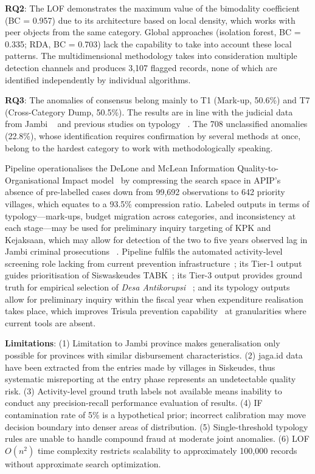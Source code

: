 \documentclass[3p,times,procedia]{elsarticle}
\begin{document}
\textbf{RQ2}: The LOF demonstrates the maximum value of the bimodality coefficient (BC = 0.957) due to its architecture based on local density, which works with peer objects from the same category. Global approaches (isolation forest, BC = 0.335; RDA, BC = 0.703) lack the capability to take into account these local patterns. The multidimensional methodology takes into consideration multiple detection channels and produces 3,107 flagged records, none of which are identified independently by individual algorithms.

\textbf{RQ3}: The anomalies of consensus belong mainly to T1 (Mark-up, 50.6\%) and T7 (Cross-Category Dump, 50.5\%). The results are in line with the judicial data from Jambi ~\cite{ref15,ref16,ref17,ref18} and previous studies on typology ~\cite{ref13,ref14}. The 708 unclassified anomalies (22.8\%), whose identification requires confirmation by several methods at once, belong to the hardest category to work with methodologically speaking.

Pipeline operationalises the DeLone and McLean Information Quality-to-Organisational Impact model~\cite{ref31} by compressing the search space in APIP’s absence of pre-labelled cases down from 99,692 observations to 642 priority villages, which equates to a 93.5\% compression ratio. Labeled outputs in terms of typology—mark-ups, budget migration across categories, and inconsistency at each stage—may be used for preliminary inquiry targeting of KPK and Kejaksaan, which may allow for detection of the two to five years observed lag in Jambi criminal prosecutions ~\cite{ref15,ref16,ref17,ref18}. Pipeline fulfils the automated activity-level screening role lacking from current prevention infrastructure~\cite{ref7}; its Tier-1 output guides prioritisation of Siswaskeudes TABK~\cite{ref6}; its Tier-3 output provides ground truth for empirical selection of \textit{Desa Antikorupsi} ~\cite{ref5}; and its typology outputs allow for preliminary inquiry within the fiscal year when expenditure realisation takes place, which improves Trisula prevention capability~\cite{ref4} at granularities where current tools are absent.

\textbf{Limitations}: (1) Limitation to Jambi province makes generalisation only possible for provinces with similar disbursement characteristics. (2) jaga.id data have been extracted from the entries made by villages in Siskeudes, thus systematic misreporting at the entry phase represents an undetectable quality risk. (3) Activity-level ground truth labels not available means inability to conduct any precision-recall performance evaluation of results. (4) IF contamination rate of 5\% is a hypothetical prior; incorrect calibration may move decision boundary into denser areas of distribution. (5) Single-threshold typology rules are unable to handle compound fraud at moderate joint anomalies. (6) LOF $O(n^2)$ time complexity restricts scalability to approximately 100,000 records without approximate search optimization.
\end{document}

